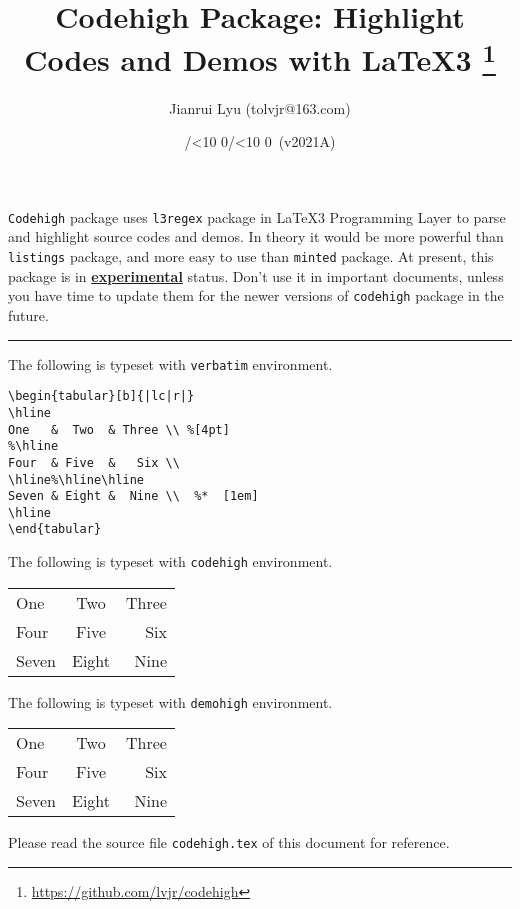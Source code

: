 \documentclass{article}
\newcommand*{\myversion}{2021A}
\newcommand*{\mydate}{\the\year/\mylpad\month/\mylpad\day\ (v\myversion)}
\newcommand*{\mylpad}[1]{\ifnum#1<10 0\the#1\else\the#1\fi}
\begin{document}
\title{\textsf{\color{green3}Codehigh Package: Highlight Codes and Demos with LaTeX3}%
       \footnote{\url{https://github.com/lvjr/codehigh}}}
\author{Jianrui Lyu (tolvjr@163.com)}
\date{\mydate}
\maketitle

\verb!Codehigh! package uses \verb!l3regex! package in \LaTeX3 Programming Layer
to parse and highlight source codes and demos.
In theory it would be more powerful than \verb!listings! package,
and more easy to use than \verb!minted! package.
At present, this package is in \underline{\color{red3}\textbf{experimental}} status.
Don’t use it in important documents, unless you have time
to update them for the newer versions of \verb!codehigh! package in the future.

\bigskip
\hrule
\bigskip

The following is typeset with \verb!verbatim! environment.

\begin{verbatim}
\begin{tabular}[b]{|lc|r|}
\hline
One   &  Two  & Three \\ %[4pt]
%\hline
Four  & Five  &   Six \\
\hline%\hline\hline
Seven & Eight &  Nine \\  %*  [1em]
\hline
\end{tabular}
\end{verbatim}

\medskip
The following is typeset with \verb!codehigh! environment.

\begin{codehigh}
\begin{tabular}[b]{|lc|r|}
\hline
One   &  Two  & Three \\ %
Four  & Five  &   Six \\
\hline%
Seven & Eight &  Nine \\  %
\hline
\end{tabular}
\end{codehigh}

\medskip
The following is typeset with \verb!demohigh! environment.

\begin{demohigh}
\begin{tabular}[b]{|lc|r|}
\hline
One   &  Two  & Three \\ %
Four  & Five  &   Six \\
\hline%
Seven & Eight &  Nine \\  %
\hline
\end{tabular}
\end{demohigh}

\medskip
Please read the source file \verb!codehigh.tex! of this document for reference.
\end{document}
